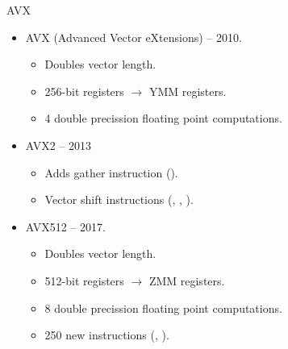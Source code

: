 \begin{frame}[t]{AVX}
\begin{itemize}
  \item AVX (Advanced Vector eXtensions) -- 2010.
    \begin{itemize}
      \item Doubles vector length.
      \item 256-bit registers $\rightarrow$ YMM registers.
      \item 4 double precission floating point computations.
    \end{itemize}

  \item AVX2 -- 2013
    \begin{itemize}
      \item Adds gather instruction ().
      \item Vector shift instructions (, , ).
    \end{itemize}

  \item AVX512 -- 2017.
    \begin{itemize}
      \item Doubles vector length.
      \item 512-bit registers $\rightarrow$ ZMM registers.
      \item 8 double precission floating point computations.
      \item 250 new instructions (, ).
    \end{itemize}
\end{itemize}
\end{frame}


